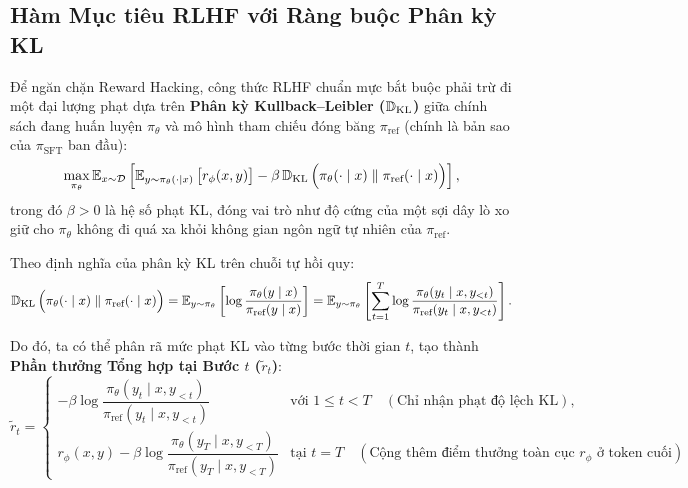\subsection{Hàm Mục tiêu RLHF với Ràng buộc Phân kỳ KL}
Để ngăn chặn Reward Hacking, công thức RLHF chuẩn mực \citep{ziegler2019fine, stiennon2020learning, ouyang2022training} bắt buộc phải trừ đi một đại lượng phạt dựa trên \textbf{Phân kỳ Kullback--Leibler ($\operatorname{\mathbb{D}_{\mathrm{KL}}}$)} giữa chính sách đang huấn luyện $\pi_\theta$ và mô hình tham chiếu đóng băng $\pi_{\text{ref}}$ (chính là bản sao của $\pi_{\text{SFT}}$ ban đầu):
\begin{equation}
    \max_{\pi_\theta} \operatorname{\mathbb{E}}_{x \sim \mathcal{D}} \left[ \operatorname{\mathbb{E}}_{y \sim \pi_\theta(\cdot \mid x)} \big[ r_\phi(x, y) \big] - \beta \operatorname{\mathbb{D}_{\mathrm{KL}}}\Big(\pi_\theta(\cdot \mid x) \parallel \pi_{\text{ref}}(\cdot \mid x)\Big) \right],
    \label{eq:rlhf_kl_objective}
\end{equation}
trong đó $\beta > 0$ là hệ số phạt KL, đóng vai trò như độ cứng của một sợi dây lò xo giữ cho $\pi_\theta$ không đi quá xa khỏi không gian ngôn ngữ tự nhiên của $\pi_{\text{ref}}$.

Theo định nghĩa của phân kỳ KL trên chuỗi tự hồi quy:
\begin{equation}
    \operatorname{\mathbb{D}_{\mathrm{KL}}}\Big(\pi_\theta(\cdot \mid x) \parallel \pi_{\text{ref}}(\cdot \mid x)\Big) = \operatorname{\mathbb{E}}_{y \sim \pi_\theta} \left[ \log \frac{\pi_\theta(y \mid x)}{\pi_{\text{ref}}(y \mid x)} \right] = \operatorname{\mathbb{E}}_{y \sim \pi_\theta} \left[ \sum_{t=1}^{T} \log \frac{\pi_\theta(y_t \mid x, y_{<t})}{\pi_{\text{ref}}(y_t \mid x, y_{<t})} \right].
\end{equation}

Do đó, ta có thể phân rã mức phạt KL vào từng bước thời gian $t$, tạo thành \textbf{Phần thưởng Tổng hợp tại Bước $t$ ($\tilde{r}_t$)}:
\begin{equation}
    \tilde{r}_t = \begin{cases}
        -\beta \log \dfrac{\pi_\theta(y_t \mid x, y_{<t})}{\pi_{\text{ref}}(y_t \mid x, y_{<t})} & \text{với } 1 \le t < T \quad (\text{Chỉ nhận phạt độ lệch KL}), \\[12pt]
        r_\phi(x, y) - \beta \log \dfrac{\pi_\theta(y_T \mid x, y_{<T})}{\pi_{\text{ref}}(y_T \mid x, y_{<T})} & \text{tại } t = T \quad (\text{Cộng thêm điểm thưởng toàn cục } r_\phi \text{ ở token cuối}).
    \end{cases}
    \label{eq:per_token_reward}
\end{equation}

